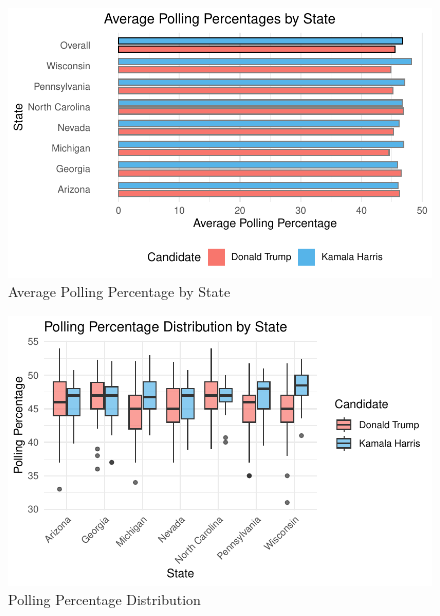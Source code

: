 \documentclass[
  letterpaper,
  DIV=11,
  numbers=noendperiod]{scrartcl}
\begin{document}
\begin{figure}

{\centering \includegraphics{paper_files/figure-pdf/fig-1-1.pdf}

}

\caption{\label{fig-1}Average Polling Percentage by State}

\end{figure}

\begin{figure}

{\centering \includegraphics{paper_files/figure-pdf/fig-2-1.pdf}

}

\caption{\label{fig-2}Polling Percentage Distribution}

\end{figure}
\end{document}
